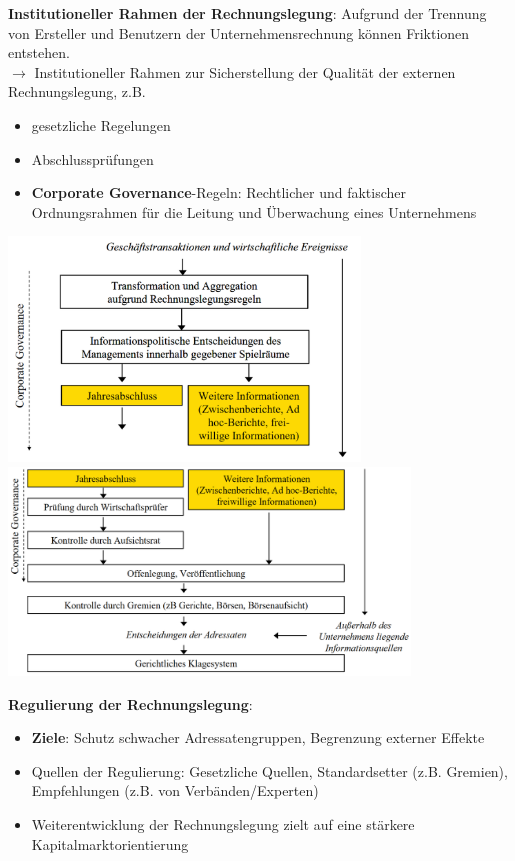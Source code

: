 \bigskip
\textbf{Institutioneller Rahmen der Rechnungslegung}:
Aufgrund der Trennung von Ersteller und Benutzern der Unternehmensrechnung können Friktionen entstehen. \\
$\rightarrow$ Institutioneller Rahmen zur Sicherstellung der Qualität der externen Rechnungslegung, z.B.
\begin{itemize}
	\item gesetzliche Regelungen
	\item Abschlussprüfungen
	\item \textbf{Corporate Governance}-Regeln: Rechtlicher und faktischer Ordnungsrahmen für die
	Leitung und Überwachung eines Unternehmens
\end{itemize}
\begin{center}
	\includegraphics[width=0.7\textwidth]{images/ir1.png}
	\includegraphics[width=0.8\textwidth]{images/ir2.png}
\end{center}

\textbf{Regulierung der Rechnungslegung}: 
\begin{itemize}
	\item \textbf{Ziele}: Schutz schwacher Adressatengruppen, Begrenzung externer Effekte
	\item Quellen der Regulierung: Gesetzliche Quellen, Standardsetter (z.B. Gremien), Empfehlungen (z.B. von Verbänden/Experten)
	\item Weiterentwicklung der Rechnungslegung zielt auf eine stärkere Kapitalmarktorientierung
\end{itemize}

